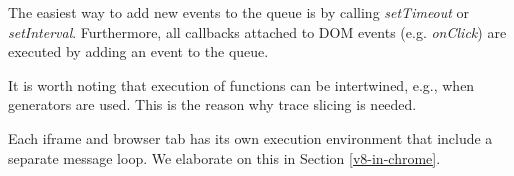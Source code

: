 The easiest way to add new events to the queue is by calling \emph{setTimeout} or \emph{setInterval}.
Furthermore, all callbacks attached to DOM events (e.g. \emph{onClick}) are executed by adding an event to the queue.

It is worth noting that execution of functions can be intertwined, e.g., when generators are used.
This is the reason why trace slicing is needed.

Each iframe and browser tab has its own execution environment that include a separate message loop.
We elaborate on this in Section \ref{v8-in-chrome}.
